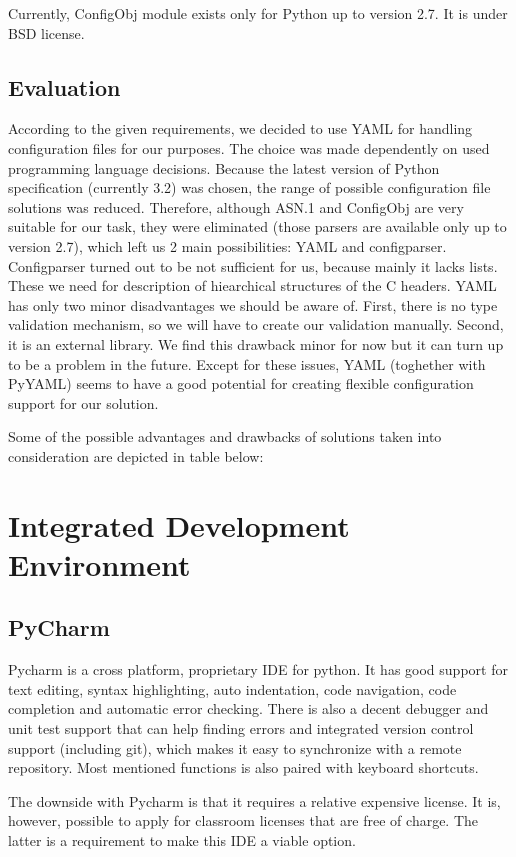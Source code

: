 \noindent Currently, ConfigObj module exists only for Python up to version
2.7. It is under BSD license.

\subsection{Evaluation}
According to the given requirements, we decided to use YAML for handling
configuration files for our purposes. The choice was made dependently on used
programming language decisions. Because the latest version of Python
specification (currently 3.2) was chosen, the range of possible configuration
file solutions was reduced. Therefore, although ASN.1 and ConfigObj are very
suitable for our task, they were eliminated (those parsers are available only
up to version 2.7), which left us 2 main possibilities: YAML and configparser.
Configparser turned out to be not sufficient for us, because mainly it lacks
lists. These we need for description of hiearchical structures of the C
headers. YAML has only two minor disadvantages we should be aware of. First,
there is no type validation mechanism, so we will have to create our validation
manually. Second, it is an external library. We find this drawback minor for
now but it can turn up to be a problem in the future. Except for these issues,
YAML (toghether with PyYAML) seems to have a good potential for creating
flexible configuration support for our solution.

Some of the possible advantages and drawbacks of solutions taken into
consideration are depicted in table below:

\section{Integrated Development Environment}

\subsection{PyCharm}
Pycharm is a cross platform, proprietary IDE for python. It has good support
for text editing, syntax highlighting, auto indentation, code navigation, code
completion and automatic error checking. There is also a decent debugger and
unit test support that can help finding errors and integrated version control
support (including git), which makes it easy to synchronize with a remote
repository. Most mentioned functions is also paired with keyboard shortcuts.

The downside with Pycharm is that it requires a relative expensive license. It
is, however, possible to apply for classroom licenses that are free of charge.
The latter is a requirement to make this IDE a viable option.

